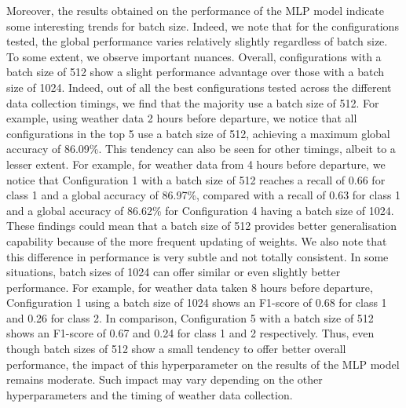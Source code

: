 \documentclass[12pt,oneside]{book} %
\begin{document}
\noindent Moreover, the results obtained on the performance of the MLP model indicate some interesting trends for batch size. Indeed, we note that for the configurations tested, the global performance varies relatively slightly regardless of batch size. To some extent, we observe important nuances. Overall, configurations with a batch size of 512 show a slight performance advantage over those with a batch size of 1024. Indeed, out of all the best configurations tested across the different data collection timings, we find that the majority use a batch size of 512. For example, using weather data 2 hours before departure, we notice that all configurations in the top 5 use a batch size of 512, achieving a maximum global accuracy of 86.09\%. This tendency can also be seen for other timings, albeit to a lesser extent. For example, for weather data from 4 hours before departure, we notice that Configuration 1 with a batch size of 512 reaches a recall of 0.66 for class 1 and a global accuracy of 86.97\%, compared with a recall of 0.63 for class 1 and a global accuracy of 86.62\% for Configuration 4 having a batch size of 1024. These findings could mean that a batch size of 512 provides better generalisation capability because of the more frequent updating of weights. We also note that this difference in performance is very subtle and not totally consistent. In some situations, batch sizes of 1024 can offer similar or even slightly better performance. For example, for weather data taken 8 hours before departure, Configuration 1 using a batch size of 1024 shows an F1-score of 0.68 for class 1 and 0.26 for class 2. In comparison, Configuration 5 with a batch size of 512 shows an F1-score of 0.67 and 0.24 for class 1 and 2 respectively. Thus, even though batch sizes of 512 show a small tendency to offer better overall performance, the impact of this hyperparameter on the results of the MLP model remains moderate. Such impact may vary depending on the other hyperparameters and the timing of weather data collection.
\end{document}
